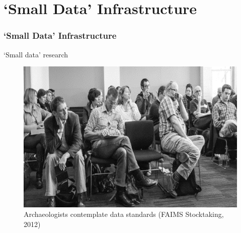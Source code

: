 

\section{`Small Data' Infrastructure}

\begin{sectionframe} %
	\frametitle{`Small Data' Infrastructure}


\end{sectionframe}




\begin{frame}{`Small data' research}
 \begin{figure}[H]
    \centering
        \vspace{-0.5cm}
        \includegraphics[height=.725\textheight]{figures/Archaeologists-standards.png}
        \caption{Archaeologists contemplate data standards (FAIMS Stocktaking, 2012)}
        \label{fig:figure7}
 \end{figure}
\end{frame}


